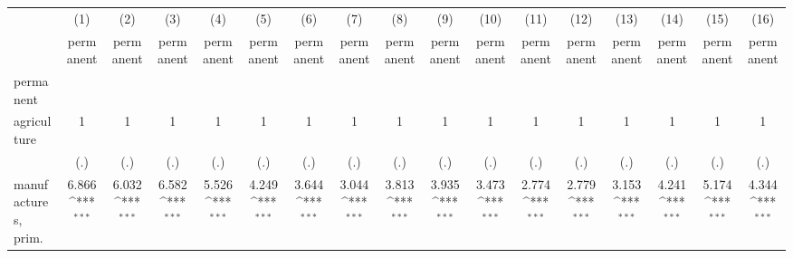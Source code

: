 {
\def\sym#1{\ifmmode^{#1}\else\(^{#1}\)\fi}
\begin{tabular}{l*{16}{c}}
\hline\hline
                    &\multicolumn{1}{c}{(1)}&\multicolumn{1}{c}{(2)}&\multicolumn{1}{c}{(3)}&\multicolumn{1}{c}{(4)}&\multicolumn{1}{c}{(5)}&\multicolumn{1}{c}{(6)}&\multicolumn{1}{c}{(7)}&\multicolumn{1}{c}{(8)}&\multicolumn{1}{c}{(9)}&\multicolumn{1}{c}{(10)}&\multicolumn{1}{c}{(11)}&\multicolumn{1}{c}{(12)}&\multicolumn{1}{c}{(13)}&\multicolumn{1}{c}{(14)}&\multicolumn{1}{c}{(15)}&\multicolumn{1}{c}{(16)}\\
                    &\multicolumn{1}{c}{permanent}&\multicolumn{1}{c}{permanent}&\multicolumn{1}{c}{permanent}&\multicolumn{1}{c}{permanent}&\multicolumn{1}{c}{permanent}&\multicolumn{1}{c}{permanent}&\multicolumn{1}{c}{permanent}&\multicolumn{1}{c}{permanent}&\multicolumn{1}{c}{permanent}&\multicolumn{1}{c}{permanent}&\multicolumn{1}{c}{permanent}&\multicolumn{1}{c}{permanent}&\multicolumn{1}{c}{permanent}&\multicolumn{1}{c}{permanent}&\multicolumn{1}{c}{permanent}&\multicolumn{1}{c}{permanent}\\
\hline
permanent           &                     &                     &                     &                     &                     &                     &                     &                     &                     &                     &                     &                     &                     &                     &                     &                     \\
agriculture         &           1         &           1         &           1         &           1         &           1         &           1         &           1         &           1         &           1         &           1         &           1         &           1         &           1         &           1         &           1         &           1         \\
                    &         (.)         &         (.)         &         (.)         &         (.)         &         (.)         &         (.)         &         (.)         &         (.)         &         (.)         &         (.)         &         (.)         &         (.)         &         (.)         &         (.)         &         (.)         &         (.)         \\
[1em]
manufactures, prim. &       6.866\sym{***}&       6.032\sym{***}&       6.582\sym{***}&       5.526\sym{***}&       4.249\sym{***}&       3.644\sym{***}&       3.044\sym{***}&       3.813\sym{***}&       3.935\sym{***}&       3.473\sym{***}&       2.774\sym{***}&       2.779\sym{***}&       3.153\sym{***}&       4.241\sym{***}&       5.174\sym{***}&       4.344\sym{***}\\

\end{tabular}}
